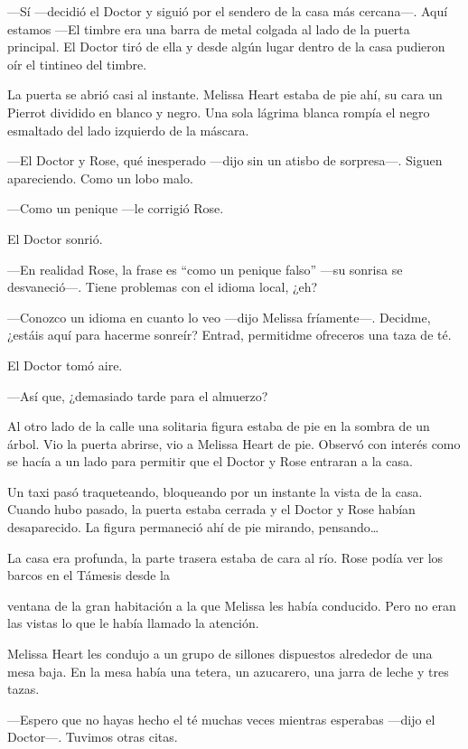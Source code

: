 {---Sí ---decidió el Doctor y siguió por el sendero de la casa más
	cercana---. Aquí estamos ---El timbre era una barra de metal colgada al
	lado de la puerta principal. El Doctor tiró de ella y desde algún lugar
dentro de la casa pudieron oír el tintineo del timbre.}

{La puerta se abrió casi al instante. Melissa Heart estaba de pie ahí,
	su cara un Pierrot dividido en blanco y negro. Una sola lágrima blanca
rompía el negro esmaltado del lado izquierdo de la máscara.}

{---El Doctor y Rose, qué inesperado ---dijo sin un atisbo de
sorpresa---. Siguen apareciendo. Como un lobo malo.}

{---Como un penique ---le corrigió Rose.}

{El Doctor sonrió.}

{---En realidad Rose, la frase es ``como un penique falso'' ---su
sonrisa se desvaneció---. Tiene problemas con el idioma local, ¿eh?}

{---Conozco un idioma en cuanto lo veo ---dijo Melissa fríamente---.
	Decidme, ¿estáis aquí para hacerme sonreír? Entrad, permitidme
ofreceros una taza de té.}

{El Doctor tomó aire.}

{---Así que, ¿demasiado tarde para el almuerzo?}

{Al otro lado de la calle una solitaria figura estaba de pie en la
	sombra de un árbol. Vio la puerta abrirse, vio a Melissa Heart de pie.
	Observó con interés como se hacía a un lado para permitir que el Doctor
y Rose entraran a la casa.}

{Un taxi pasó traqueteando, bloqueando por un instante la vista de la
	casa. Cuando hubo pasado, la puerta estaba cerrada y el Doctor y Rose
	habían desaparecido. La figura permaneció ahí de pie mirando,
	pensando\ldots{}}

{La casa era profunda, la parte trasera estaba de cara al río. Rose
podía ver los barcos en el Támesis desde la}

{ventana de la gran habitación a la que Melissa les había conducido.
Pero no eran las vistas lo que le había llamado la atención.}

{Melissa Heart les condujo a un grupo de sillones dispuestos alrededor
	de una mesa baja. En la mesa había una tetera, un azucarero, una jarra
de leche y tres tazas.}

{---Espero que no hayas hecho el té muchas veces mientras esperabas
---dijo el Doctor---. Tuvimos otras citas.}

